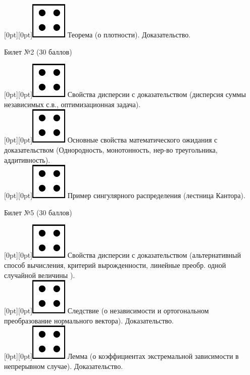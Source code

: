 \documentclass[10pt]{article}
\begin{document}
\raisebox{-1pt}[0pt][0pt]{\includegraphics[width=0.02\linewidth]{4.png}} Теорема (о плотности). Доказательство. \\

\begin{center} {\Large Билет №2 (30 баллов)} \end{center}

\raisebox{-1pt}[0pt][0pt]{\includegraphics[width=0.02\linewidth]{4.png}} Свойства дисперсии с доказательством (дисперсия суммы независимых с.в., оптимизационная задача). \\ 

\raisebox{-1pt}[0pt][0pt]{\includegraphics[width=0.02\linewidth]{4.png}} Основные свойства математического ожидания с доказательством (Однородность, монотонность, нер-во треугольника, аддитивность). \\

\raisebox{-1pt}[0pt][0pt]{\includegraphics[width=0.02\linewidth]{4.png}}   Пример сингулярного распределения (лестница Кантора). \\

\begin{center} {\Large Билет №5 (30 баллов)} \end{center}

\raisebox{-1pt}[0pt][0pt]{\includegraphics[width=0.02\linewidth]{4.png}} Свойства дисперсии с доказательством (альтернативный способ вычисления, критерий вырожденности, линейные преобр. одной случайной величины ). \\ 

\raisebox{-1pt}[0pt][0pt]{\includegraphics[width=0.02\linewidth]{4.png}} Следствие (о независимости и  ортогональном преобразование нормального вектора). Доказательство. \\ 

\raisebox{-1pt}[0pt][0pt]{\includegraphics[width=0.02\linewidth]{4.png}} Лемма (о коэффициентах экстремальной зависимости в непрерывном случае). Доказательство. \\
\end{document}
